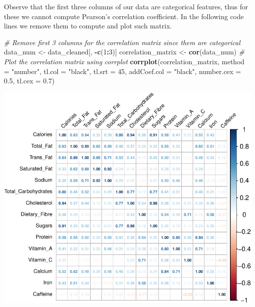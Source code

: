 \documentclass[
]{article}
\newenvironment{Shaded}{\begin{snugshade}}{\end{snugshade}}
\newcommand{\AttributeTok}[1]{\textcolor[rgb]{0.13,0.29,0.53}{#1}}
\newcommand{\CommentTok}[1]{\textcolor[rgb]{0.56,0.35,0.01}{\textit{#1}}}
\newcommand{\DecValTok}[1]{\textcolor[rgb]{0.00,0.00,0.81}{#1}}
\newcommand{\FloatTok}[1]{\textcolor[rgb]{0.00,0.00,0.81}{#1}}
\newcommand{\FunctionTok}[1]{\textcolor[rgb]{0.13,0.29,0.53}{\textbf{#1}}}
\newcommand{\NormalTok}[1]{#1}
\newcommand{\OtherTok}[1]{\textcolor[rgb]{0.56,0.35,0.01}{#1}}
\newcommand{\SpecialCharTok}[1]{\textcolor[rgb]{0.81,0.36,0.00}{\textbf{#1}}}
\newcommand{\StringTok}[1]{\textcolor[rgb]{0.31,0.60,0.02}{#1}}
\begin{document}
Observe that the first three columns of our data are categorical
features, thus for these we cannot compute Pearson's correlation
coefficient. In the following code lines we remove them to compute and
plot such matrix.

\begin{Shaded}
\begin{Highlighting}[]
\CommentTok{\# Remove first 3 columns for the correlation matrix since them are categorical}
\NormalTok{data\_num }\OtherTok{\textless{}{-}}\NormalTok{ data\_cleaned[, }\SpecialCharTok{{-}}\FunctionTok{c}\NormalTok{(}\DecValTok{1}\SpecialCharTok{:}\DecValTok{3}\NormalTok{)]}
\NormalTok{correlation\_matrix }\OtherTok{\textless{}{-}} \FunctionTok{cor}\NormalTok{(data\_num)}
\CommentTok{\# Plot the correlation matrix using corrplot}
\FunctionTok{corrplot}\NormalTok{(correlation\_matrix, }\AttributeTok{method =} \StringTok{"number"}\NormalTok{, }\AttributeTok{tl.col =} \StringTok{"black"}\NormalTok{, }
         \AttributeTok{tl.srt =} \DecValTok{45}\NormalTok{, }\AttributeTok{addCoef.col =} \StringTok{"black"}\NormalTok{, }\AttributeTok{number.cex =} \FloatTok{0.5}\NormalTok{, }\AttributeTok{tl.cex =} \FloatTok{0.7}\NormalTok{)}
\end{Highlighting}
\end{Shaded}

\begin{center}\includegraphics{Statistical_Learning_Final_Report_files/figure-latex/correlation_analysis-1} \end{center}
\end{document}
